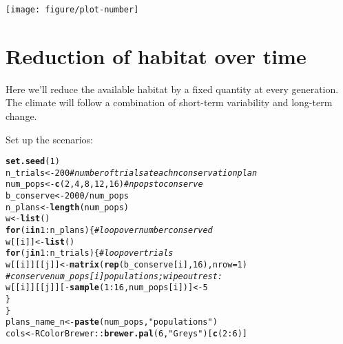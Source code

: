 \documentclass[10pt]{article}\usepackage[]{graphicx}\usepackage[]{color}
\makeatletter
\def\maxwidth{ %
  \ifdim\Gin@nat@width>\linewidth
    \linewidth
  \else
    \Gin@nat@width
  \fi
}
\newcommand{\hlnum}[1]{\textcolor[rgb]{0.686,0.059,0.569}{#1}}%
\newcommand{\hlstr}[1]{\textcolor[rgb]{0.192,0.494,0.8}{#1}}%
\newcommand{\hlcom}[1]{\textcolor[rgb]{0.678,0.584,0.686}{\textit{#1}}}%
\newcommand{\hlopt}[1]{\textcolor[rgb]{0,0,0}{#1}}%
\newcommand{\hlstd}[1]{\textcolor[rgb]{0.345,0.345,0.345}{#1}}%
\newcommand{\hlkwa}[1]{\textcolor[rgb]{0.161,0.373,0.58}{\textbf{#1}}}%
\newcommand{\hlkwb}[1]{\textcolor[rgb]{0.69,0.353,0.396}{#1}}%
\newcommand{\hlkwc}[1]{\textcolor[rgb]{0.333,0.667,0.333}{#1}}%
\newcommand{\hlkwd}[1]{\textcolor[rgb]{0.737,0.353,0.396}{\textbf{#1}}}%
\newenvironment{kframe}{%
 \def\at@end@of@kframe{}%
 \ifinner\ifhmode%
  \def\at@end@of@kframe{\end{minipage}}%
  \begin{minipage}{\columnwidth}%
 \fi\fi%
 \def\FrameCommand##1{\hskip\@totalleftmargin \hskip-\fboxsep
 \colorbox{shadecolor}{##1}\hskip-\fboxsep
     \hskip-\linewidth \hskip-\@totalleftmargin \hskip\columnwidth}%
 \MakeFramed {\advance\hsize-\width
   \@totalleftmargin\z@ \linewidth\hsize
   \@setminipage}}%
 {\par\unskip\endMakeFramed%
 \at@end@of@kframe}
\newenvironment{knitrout}{}{} %
\makeatother
\begin{document}
\begin{knitrout}
{\centering \texttt{[image: figure/plot-number]} 

}



\end{knitrout}

\section{Reduction of habitat over time}

Here we'll reduce the available habitat by a fixed quantity at every generation. The climate will follow a combination of short-term variability and long-term change.

Set up the scenarios:

\begin{knitrout}
\color{fgcolor}\begin{kframe}
\begin{alltt}
\hlkwd{set.seed}\hlstd{(}\hlnum{1}\hlstd{)}
\hlstd{n_trials} \hlkwb{<-} \hlnum{200} \hlcom{# number of trials at each n conservation plan}
\hlstd{num_pops} \hlkwb{<-} \hlkwd{c}\hlstd{(}\hlnum{2}\hlstd{,} \hlnum{4}\hlstd{,} \hlnum{8}\hlstd{,} \hlnum{12}\hlstd{,} \hlnum{16}\hlstd{)} \hlcom{# n pops to conserve}
\hlstd{b_conserve} \hlkwb{<-} \hlnum{2000} \hlopt{/} \hlstd{num_pops}
\hlstd{n_plans} \hlkwb{<-} \hlkwd{length}\hlstd{(num_pops)}
\hlstd{w} \hlkwb{<-} \hlkwd{list}\hlstd{()}
\hlkwa{for}\hlstd{(i} \hlkwa{in} \hlnum{1}\hlopt{:}\hlstd{n_plans) \{} \hlcom{# loop over number conserved}
 \hlstd{w[[i]]} \hlkwb{<-} \hlkwd{list}\hlstd{()}
 \hlkwa{for}\hlstd{(j} \hlkwa{in} \hlnum{1}\hlopt{:}\hlstd{n_trials) \{} \hlcom{# loop over trials}
   \hlstd{w[[i]][[j]]} \hlkwb{<-} \hlkwd{matrix}\hlstd{(}\hlkwd{rep}\hlstd{(b_conserve[i],} \hlnum{16}\hlstd{),} \hlkwc{nrow} \hlstd{=} \hlnum{1}\hlstd{)}
   \hlcom{# conserve num_pops[i] populations; wipe out rest:}
   \hlstd{w[[i]][[j]][}\hlopt{-}\hlkwd{sample}\hlstd{(}\hlnum{1}\hlopt{:}\hlnum{16}\hlstd{, num_pops[i])]} \hlkwb{<-} \hlnum{5}
 \hlstd{\}}
\hlstd{\}}
\hlstd{plans_name_n} \hlkwb{<-} \hlkwd{paste}\hlstd{(num_pops,} \hlstr{"populations"}\hlstd{)}
\hlstd{cols} \hlkwb{<-} \hlstd{RColorBrewer::}\hlkwd{brewer.pal}\hlstd{(}\hlnum{6}\hlstd{,} \hlstr{"Greys"}\hlstd{)[}\hlkwd{c}\hlstd{(}\hlnum{2}\hlopt{:}\hlnum{6}\hlstd{)]}
\end{alltt}
\end{kframe}
\end{knitrout}
\end{document}
